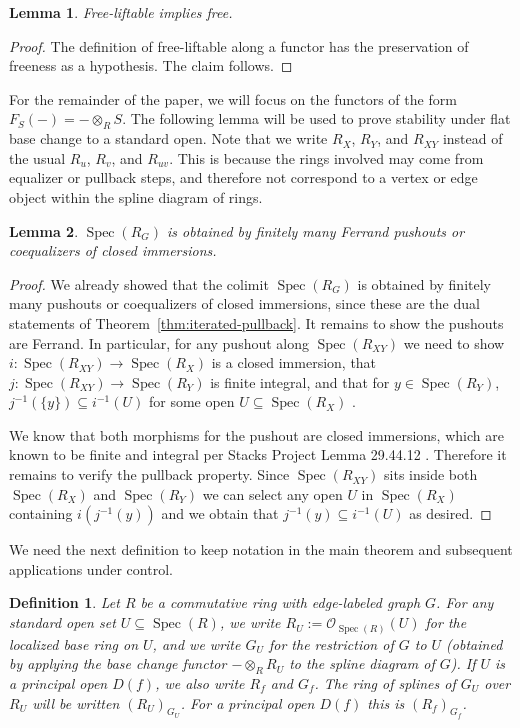 \documentclass{article}
\DeclareMathOperator{\Spec}{Spec}
\newtheorem{definition}{Definition}
\newtheorem{lemma}{Lemma}
\begin{document}
\begin{lemma}
\label{lma:free-lift}
Free-liftable implies free.
\end{lemma}
\begin{proof}
The definition of free-liftable along a functor has the preservation of freeness as a hypothesis. The claim follows.
\end{proof}

For the remainder of the paper, we will focus on the functors of the form $F_S(-) = - \otimes_R S$. The following lemma will be used to prove stability under flat base change to a standard open. Note that we write $R_X$, $R_Y$, and $R_{XY}$ instead of the usual $R_u$, $R_v$, and $R_{uv}$. This is because the rings involved may come from equalizer or pullback steps, and therefore not correspond to a vertex or edge object within the spline diagram of rings.

\begin{lemma}
\label{lma:gluing-lemma}
$\Spec(R_{G})$ is obtained by finitely many Ferrand pushouts or coequalizers of closed immersions.
\end{lemma}
\begin{proof}

We already showed that the colimit $\Spec(R_{G})$ is obtained by finitely many pushouts or coequalizers of closed immersions, since these are the dual statements of Theorem~\ref{thm:iterated-pullback}. It remains to show the pushouts are Ferrand. In particular, for any pushout along $\Spec(R_{XY})$ we need to show $i: \Spec(R_{XY}) \rightarrow \Spec(R_X)$ is a closed immersion, that $j: \Spec(R_{XY}) \rightarrow \Spec(R_Y)$ is finite integral, and that for $y \in \Spec(R_Y)$, $j^{-1}(\{y\}) \subseteq i^{-1}(U)$ for some open $U \subseteq \Spec(R_X)$ \cite{StacksPushoutsII}.

We know that both morphisms for the pushout are closed immersions, which are known to be finite and integral per Stacks Project Lemma 29.44.12 \cite{StacksIntegralFinite}. Therefore it remains to verify the pullback property. Since $\Spec(R_{XY})$ sits inside both $\Spec(R_X)$ and $\Spec(R_Y)$ we can select any open $U$ in $\Spec(R_X)$ containing $i(j^{-1}(y))$ and we obtain that $j^{-1}({y}) \subseteq i^{-1}(U)$ as desired.
\end{proof}

We need the next definition to keep notation in the main theorem and subsequent applications under control.

 \begin{definition}
Let $R$ be a commutative ring with edge-labeled graph $G$. For any standard open set $U \subseteq \Spec(R)$, we write $R_U := \mathcal{O}_{\Spec(R)}(U)$ for the localized base ring on $U$, and we write $G_U$ for the restriction of $G$ to $U$ (obtained by applying the base change functor $-\otimes_R R_U$ to the spline diagram of $G$). If $U$ is a principal open $D(f)$, we also write $R_f$ and $G_f$. The ring of splines of $G_U$ over $R_U$ will be written $(R_U)_{G_U}$. For a principal open $D(f)$ this is $(R_f)_{G_f}$.
\end{definition}
\end{document}
